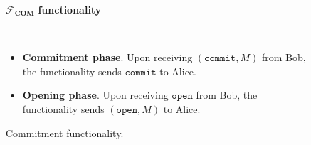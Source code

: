 \begin{figure}[h!]
\centering
\begin{tcolorbox}
                        
    \centerline{$\mathcal{F}_{\textbf{COM}}$ \textbf{functionality}}
            
    \
    
    \begin{itemize}
        \item \textbf{Commitment phase}. Upon receiving $( \texttt{commit}, M)$ from Bob, the functionality sends $\texttt{commit}$ to Alice. 
        \item \textbf{Opening phase}. Upon receiving $\texttt{open}$ from Bob, the functionality sends $(\texttt{open}, M)$ to Alice. 
    \end{itemize}
    
\end{tcolorbox} 
    \caption{Commitment functionality.}
    \label{fig:func_com}
\end{figure}


%
%
%
